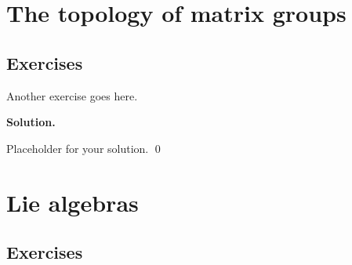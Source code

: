 \documentclass[12pt]{book}
\theoremstyle{definition}
\newenvironment{solution}
{%
  \par\noindent\textbf{Solution.}\quad
}
{%
  \qed\par
}
\begin{document}
\chapter{The topology of matrix groups}
\section{Exercises}

\begin{taggedexercise}[TODO]
Another exercise goes here.
\end{taggedexercise}

\begin{solution}
Placeholder for your solution.
\end{solution}

\chapter{Lie algebras}
\section{Exercises}

\begin{taggedexercise}[TODO]

\end{taggedexercise}

\begin{taggedexercise}[TODO]

\end{taggedexercise}

\begin{taggedexercise}[TODO]

\end{taggedexercise}

\begin{taggedexercise}[TODO]

\end{taggedexercise}

\begin{taggedexercise}[TODO]

\end{taggedexercise}
\end{document}
